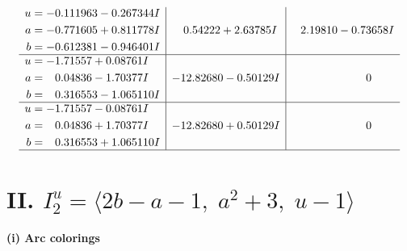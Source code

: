 \documentclass[1p]{elsarticle_modified}
\theoremstyle{definition}
\begin{document}
$$\begin{array}{c|c|c}
\begin{aligned}
u &= -0.111963 - 0.267344 I \\
a &= -0.771605 + 0.811778 I \\
b &= -0.612381 - 0.946401 I\end{aligned}
 & \phantom{-}0.54222 + 2.63785 I & \phantom{-}2.19810 - 0.73658 I \\ \hline\begin{aligned}
u &= -1.71557 + 0.08761 I \\
a &= \phantom{-}0.04836 - 1.70377 I \\
b &= \phantom{-}0.316553 - 1.065110 I\end{aligned}
 & -12.82680 - 0.50129 I & \phantom{-0.000000 } 0 \\ \hline\begin{aligned}
u &= -1.71557 - 0.08761 I \\
a &= \phantom{-}0.04836 + 1.70377 I \\
b &= \phantom{-}0.316553 + 1.065110 I\end{aligned}
 & -12.82680 + 0.50129 I & \phantom{-0.000000 } 0\\
 \hline 
 \end{array}$$\newpage\newpage\renewcommand{\arraystretch}{1}
\centering \section*{II. $I^u_{2}= \langle 2 b- a-1,\;a^2+3,\;u-1 \rangle$}
\flushleft \textbf{(i) Arc colorings}\\
\end{document}
